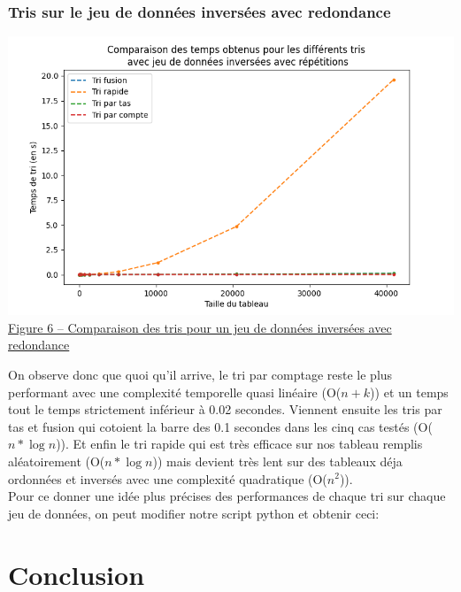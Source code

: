 \documentclass[11pt,a4paper]{article}
\begin{document}
\subsubsection{Tris sur le jeu de données inversées avec redondance}
\includegraphics[scale = 0.5]{Images/Courbes img/inversé avec rep/inversées avec répétitions.png}\\
\underline {Figure 6 – Comparaison des tris pour un jeu de données inversées avec redondance}

\newpage

On observe donc que quoi qu'il arrive, le tri par comptage reste le plus performant avec une complexité temporelle
quasi linéaire (O($n+k$)) et un temps tout le temps strictement inférieur à 0.02 secondes. Viennent ensuite les tris par tas et fusion
qui cotoient la barre des 0.1 secondes dans les cinq cas testés (O($n * \log{n}$)). Et enfin le tri rapide qui est très efficace sur nos tableau
remplis aléatoirement (O($n * \log{n}$)) mais devient très lent sur des tableaux déja ordonnées et inversés avec une complexité quadratique (O($n^2$)).\\
Pour ce donner une idée plus précises des performances de chaque tri sur chaque jeu de données, on peut modifier notre script python et obtenir ceci:\\
\newpage

\section{Conclusion}
\end{document}
